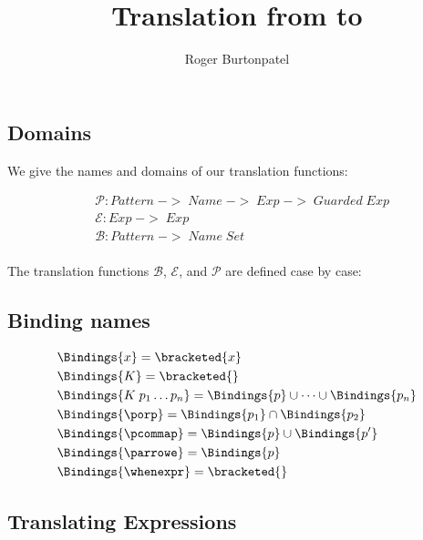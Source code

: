 \documentclass[]{article}
\title{Translation from \PPlus to \VMinus}
\author{Roger Burtonpatel}
\begin{document}
\maketitle

\subsection{Domains}
We give the names and domains of our translation functions: 

\begin{align*}
    &\mathcal{P}: Pattern\; ->\; Name\; ->\; Exp\; ->\; Guarded\; Exp \\
    &\mathcal{E}: Exp\; ->\; Exp \\
    &\mathcal{B}: Pattern\; ->\; Name\; Set \\
    \end{align*}

The translation functions $\mathcal{B}$, $\mathcal{E}$, and $\mathcal{P}$
are defined case by case: 

\subsection{Binding names}

\begin{align*}
    &\Bindings{x} = \bracketed{x} \\ 
    &\Bindings{K} = \bracketed{} \\
    &\Bindings{K \; p_{1} \dots p_{n}} = \Bindings{p} \cup \dots \cup \Bindings{p_{n}} \\
    &\Bindings{\porp} = \Bindings{p_{1}} \cap \Bindings{p_{2}} \\
    &\Bindings{\pcommap} = \Bindings{p} \cup \Bindings{p'} \\
    &\Bindings{\parrowe} = \Bindings{p} \\
    &\Bindings{\whenexpr} = \bracketed{}
\end{align*}

\subsection{Translating Expressions}
\end{document}
